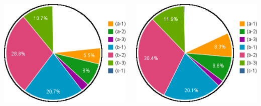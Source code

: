 \documentclass[compress]{beamer}
\begin{document}
\begin{frame}
\begin{columns}
\includegraphics[width=\linewidth]{chart2d_4mu_400.png}

\includegraphics[width=\linewidth]{chart2d_4mu_600.png}
\end{columns}

\vspace{0.3 cm}
\end{frame}
\end{document}
